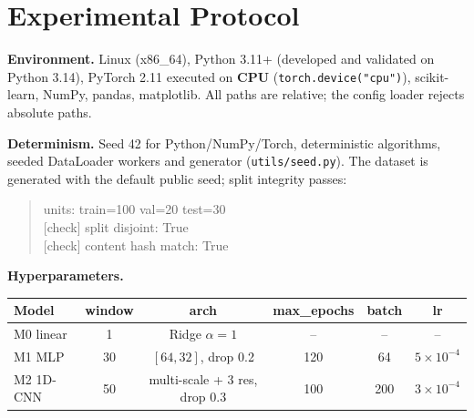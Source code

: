 \documentclass[11pt,a4paper]{article}
\newcommand{\code}[1]{\texttt{\small #1}}
\begin{document}
\section{Experimental Protocol}\label{sec:protocol}

\textbf{Environment.} Linux (x86\_64), Python 3.11+ (developed and validated on
Python 3.14), PyTorch 2.11 executed on \textbf{CPU} (\code{torch.device("cpu")}),
scikit-learn, NumPy, pandas, matplotlib. All paths are relative; the config
loader rejects absolute paths.

\textbf{Determinism.} Seed 42 for Python/NumPy/Torch, deterministic algorithms,
seeded DataLoader workers and generator (\code{utils/seed.py}). The dataset is
generated with the default public seed; split integrity passes:
\begin{quote}\small\ttfamily
[check] units: train=100 val=20 test=30\\
{}[check] split disjoint: True\\
{}[check] content hash match: True
\end{quote}

\textbf{Hyperparameters.}
\begin{center}
\begin{tabular}{l c c c c c}
\toprule
Model & window & arch & max\_epochs & batch & lr\\
\midrule
M0 linear & 1  & Ridge $\alpha{=}1$        & --   & --  & --\\
M1 MLP    & 30 & $[64,32]$, drop 0.2       & 120  & 64  & $5\times10^{-4}$\\
M2 1D-CNN & 50 & multi-scale + 3 res, drop 0.3 & 100 & 200 & $3\times10^{-4}$\\
\bottomrule
\end{tabular}
\end{center}
\end{document}
